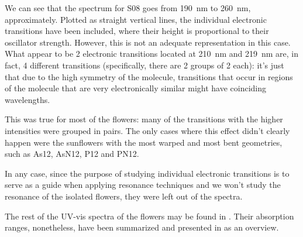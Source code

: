 We can see that the spectrum for S08 goes from \SI{190}{\nano\metre} to \SI{260}{\nano\metre}, approximately.
Plotted as straight vertical lines, the individual electronic transitions have been included, where their height is proportional to their oscillator strength.
However, this is not an adequate representation in this case.
What appear to be 2 electronic transitions located at \SI{210}{\nano\metre} and \SI{219}{\nano\metre} are, in fact, 4 different transitions (specifically, there are 2 groups of 2 each): it's just that due to the high symmetry of the molecule, transitions that occur in regions of the molecule that are very electronically similar might have coinciding wavelengths.

This was true for most of the flowers: many of the transitions with the higher intensities were grouped in pairs.
The only cases where this effect didn't clearly happen were the sunflowers with the most warped and most bent geometries, such as As12, AsN12, P12 and PN12.

In any case, since the purpose of studying individual electronic transitions is to serve as a guide when applying resonance techniques and we won't study the resonance of the isolated flowers, they were left out of the spectra.

The rest of the UV-vis spectra of the flowers may be found in .
Their absorption ranges, nonetheless, have been summarized and presented in  as an overview.
